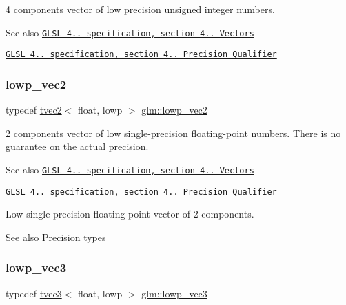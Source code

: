 4 components vector of low precision unsigned integer numbers.

\begin{DoxySeeAlso}{See also}
\href{http://www.opengl.org/registry/doc/GLSLangSpec.4.20.8.pdf}{\tt G\+L\+SL 4.. specification, section 4.. Vectors} 

\href{http://www.opengl.org/registry/doc/GLSLangSpec.4.20.8.pdf}{\tt G\+L\+SL 4.. specification, section 4.. Precision Qualifier} 
\end{DoxySeeAlso}
\mbox{\label{group__core__precision_ga1b46182364e2054858f9e7a70f8c52bc}} 
\subsubsection{\texorpdfstring{lowp\+\_\+vec2}{lowp\_vec2}}
{\footnotesize\ttfamily typedef \hyperlink{structglm_1_1tvec2}{tvec2}$<$ float, lowp $>$ \hyperlink{group__core__precision_ga1b46182364e2054858f9e7a70f8c52bc}{glm\+::lowp\+\_\+vec2}}

2 components vector of low single-\/precision floating-\/point numbers. There is no guarantee on the actual precision.

\begin{DoxySeeAlso}{See also}
\href{http://www.opengl.org/registry/doc/GLSLangSpec.4.20.8.pdf}{\tt G\+L\+SL 4.. specification, section 4.. Vectors} 

\href{http://www.opengl.org/registry/doc/GLSLangSpec.4.20.8.pdf}{\tt G\+L\+SL 4.. specification, section 4.. Precision Qualifier}
\end{DoxySeeAlso}
Low single-\/precision floating-\/point vector of 2 components. \begin{DoxySeeAlso}{See also}
\hyperlink{group__core__precision}{Precision types} 
\end{DoxySeeAlso}
\mbox{\label{group__core__precision_ga0229a1c4abd7c51f15eeb7a0fec3846b}} 
\subsubsection{\texorpdfstring{lowp\+\_\+vec3}{lowp\_vec3}}
{\footnotesize\ttfamily typedef \hyperlink{structglm_1_1tvec3}{tvec3}$<$ float, lowp $>$ \hyperlink{group__core__precision_ga0229a1c4abd7c51f15eeb7a0fec3846b}{glm\+::lowp\+\_\+vec3}}

